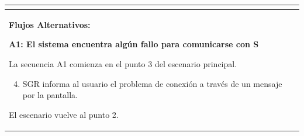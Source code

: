 \begin{longtable}{|l|p{5.5cm}|l|p{2cm}|l|p{1.9cm}|}
{					} \\ \hline

					\multicolumn{6}{|p{15cm}|}{ \textbf{Flujos Alternativos: }
					
					\textbf{A1: El sistema encuentra algún fallo para comunicarse con S}
					
					La secuencia A1 comienza en el punto 3 del escenario principal.
					\begin{enumerate}
							\setcounter{enumi}{3}
							\item SGR informa al usuario el problema de conexión a través de un mensaje por la pantalla.
					\end{enumerate}

					El escenario vuelve al punto 2.

					} \\ \hline

			\end{longtable}


